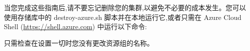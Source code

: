 当您完成这些指南后,请不要忘记删除您的集群,以避免不必要的成本发生。您可以使用存储库中的 destroy-azure.sh 脚本并在本地运行它,或者只需在 Azure Cloud Shell (\url{https://shell.azure.com}) 中运行以下命令:


只需检查在设置一切时您没有更改资源组的名称。
